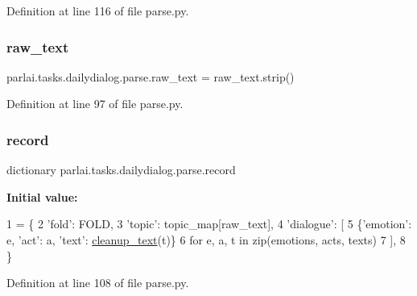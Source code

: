 Definition at line 116 of file parse.\+py.

\mbox{\label{namespaceparlai_1_1tasks_1_1dailydialog_1_1parse_a6928532917f959f2a4efb079fde20949}} 
\subsubsection{\texorpdfstring{raw\+\_\+text}{raw\_text}}
{\footnotesize\ttfamily parlai.\+tasks.\+dailydialog.\+parse.\+raw\+\_\+text = raw\+\_\+text.\+strip()}



Definition at line 97 of file parse.\+py.

\mbox{\label{namespaceparlai_1_1tasks_1_1dailydialog_1_1parse_a0774e7d0e2917f02dec4999e17c26eee}} 
\subsubsection{\texorpdfstring{record}{record}}
{\footnotesize\ttfamily dictionary parlai.\+tasks.\+dailydialog.\+parse.\+record}

{\bfseries Initial value\+:}
\begin{DoxyCode}
1 =  \{
2         \textcolor{stringliteral}{'fold'}: FOLD,
3         \textcolor{stringliteral}{'topic'}: topic\_map[raw\_text],
4         \textcolor{stringliteral}{'dialogue'}: [
5             \{\textcolor{stringliteral}{'emotion'}: e, \textcolor{stringliteral}{'act'}: a, \textcolor{stringliteral}{'text'}: \hyperlink{namespaceparlai_1_1tasks_1_1dailydialog_1_1parse_a9bee736957d0b4eb0a046855faa821dc}{cleanup\_text}(t)\}
6             \textcolor{keywordflow}{for} e, a, t \textcolor{keywordflow}{in} zip(emotions, acts, texts)
7         ],
8     \}
\end{DoxyCode}


Definition at line 108 of file parse.\+py.

\mbox{\label{namespaceparlai_1_1tasks_1_1dailydialog_1_1parse_ad0b494b4bb78b7da65dba688516fd065}} 
